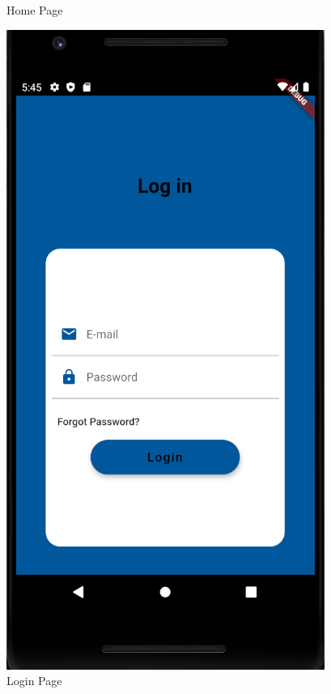 \documentclass[12pt]{article}
\begin{document}
\begin{figure}[h]
\begin{minipage}[b]{0.32\textwidth}
    \caption{Home Page}
  \end{minipage}
  \hfill
  \begin{minipage}[b]{0.32\textwidth}
    \includegraphics[width=\textwidth]{Login.PNG}
    \caption{Login Page}
     

\end{minipage}
\end{figure}
\end{document}
